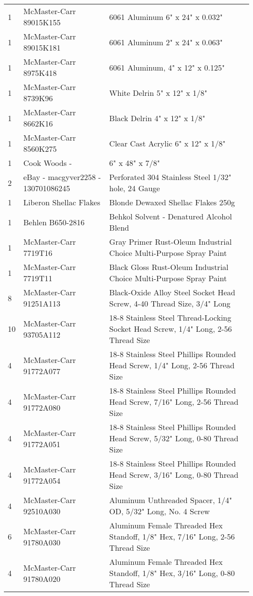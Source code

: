 \begin{longtabu}{X[1,c,m] X[6,c,m] X[9,l,m]}
  1 & McMaster-Carr 89015K155 & 6061 Aluminum 6" x 24" x 0.032" \\
  1 & McMaster-Carr 89015K181 & 6061 Aluminum 2" x 24" x 0.063" \\
  1 & McMaster-Carr 8975K418 & 6061 Aluminum, 4" x 12" x 0.125" \\
  1 & McMaster-Carr 8739K96 & White Delrin 5" x 12" x 1/8" \\
  1 & McMaster-Carr 8662K16 & Black Delrin 4" x 12" x 1/8" \\
  1 & McMaster-Carr 8560K275 & Clear Cast Acrylic 6" x 12" x 1/8" \\
  1 & Cook Woods - \wood{} & 6" x 48" x 7/8" \\
  2 & eBay - macgyver2258 - 130701086245 & Perforated 304 Stainless Steel 1/32" hole, 24 Gauge \\ \mrule

  1 & Liberon Shellac Flakes & Blonde Dewaxed Shellac Flakes 250g \\
  1 & Behlen B650-2816 & Behkol Solvent - Denatured Alcohol Blend \\
  1 & McMaster-Carr 7719T16 & Gray Primer Rust-Oleum Industrial Choice Multi-Purpose Spray Paint \\
  1 & McMaster-Carr 7719T11 & Black Gloss Rust-Oleum Industrial Choice Multi-Purpose Spray Paint \\ \mrule

  8 & McMaster-Carr 91251A113 & Black-Oxide Alloy Steel Socket Head Screw, 4-40 Thread Size, 3/4" Long \\
  10 & McMaster-Carr 93705A112 & 18-8 Stainless Steel Thread-Locking Socket Head Screw, 1/4" Long, 2-56 Thread Size \\
  4 & McMaster-Carr 91772A077 & 18-8 Stainless Steel Phillips Rounded Head Screw, 1/4" Long, 2-56 Thread Size \\
  4 & McMaster-Carr 91772A080 & 18-8 Stainless Steel Phillips Rounded Head Screw, 7/16" Long, 2-56 Thread Size \\
  4 & McMaster-Carr 91772A051 & 18-8 Stainless Steel Phillips Rounded Head Screw, 5/32" Long, 0-80 Thread Size \\
  4 & McMaster-Carr 91772A054 & 18-8 Stainless Steel Phillips Rounded Head Screw, 3/16" Long, 0-80 Thread Size \\

  4 & McMaster-Carr 92510A030 & Aluminum Unthreaded Spacer, 1/4" OD, 5/32" Long, No. 4 Screw \\
  6 & McMaster-Carr 91780A030 & Aluminum Female Threaded Hex Standoff, 1/8" Hex, 7/16" Long, 2-56 Thread Size \\
  4 & McMaster-Carr 91780A020 & Aluminum Female Threaded Hex Standoff, 1/8" Hex, 3/16" Long, 0-80 Thread Size \\


\end{longtabu}
